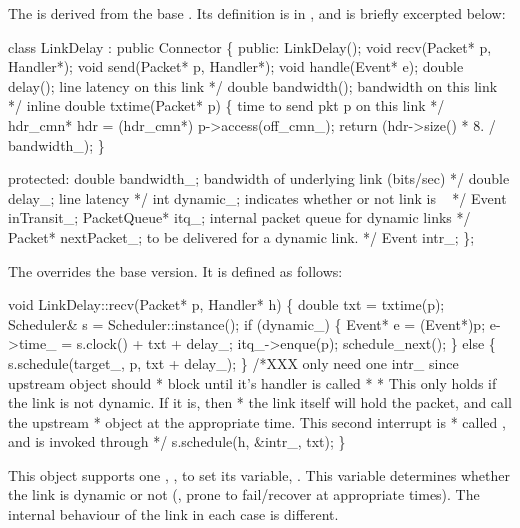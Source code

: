 The  is derived from the
base .
Its definition is in , and is briefly excerpted below:
\begin{program}
        class LinkDelay : public Connector \{
         public:
                LinkDelay();
                void recv(Packet* p, Handler*);
                void send(Packet* p, Handler*);
                void handle(Event* e);
                double delay();    \* line latency on this link */
                double bandwidth(); \* bandwidth on this link */
                inline double txtime(Packet* p) \{ \* time to send pkt p on this link */
                        hdr_cmn* hdr = (hdr_cmn*) p->access(off_cmn_);
                        return (hdr->size() * 8. / bandwidth_);
                \}

         protected:
                double bandwidth_; \* bandwidth of underlying link (bits/sec) */
                double delay_;     \* line latency */
                int dynamic_;     \* indicates whether or not link is ~ */
                Event inTransit_;
                PacketQueue* itq_; \* internal packet queue for dynamic links */
                Packet* nextPacket_; \* to be delivered for a dynamic link. */
                Event intr_;
        \};
\end{program}
The 
overrides the base
 version.
It is defined as follows:
\begin{program}
        void LinkDelay::recv(Packet* p, Handler* h)
        \{    
                double txt = txtime(p);
                Scheduler& s = Scheduler::instance();
                if (dynamic_) \{
                        Event* e = (Event*)p;
                        e->time_ = s.clock() + txt + delay_; 
                        itq_->enque(p);
                        schedule_next();
                \} else \{
                        s.schedule(target_, p, txt + delay_);
                \}       
                /*{\cf XXX only need one intr_ since upstream object should}
                 * {\cf block until it's handler is called}
                 *       
                 * {\cf This only holds if the link is not dynamic.  If it is, then}
                 * {\cf the link itself will hold the packet, and call the upstream}
                 * {\cf object at the appropriate time.  This second interrupt is}
                 * {\cf called , and is invoked through }
                 */
                s.schedule(h, &intr_, txt);
        \}   
\end{program}
This object supports one 
,
,
to set its variable, . 
This variable determines whether the link is dynamic or not (\ie, prone
to fail/recover at appropriate times).
The internal behaviour of the link in each case is different.

